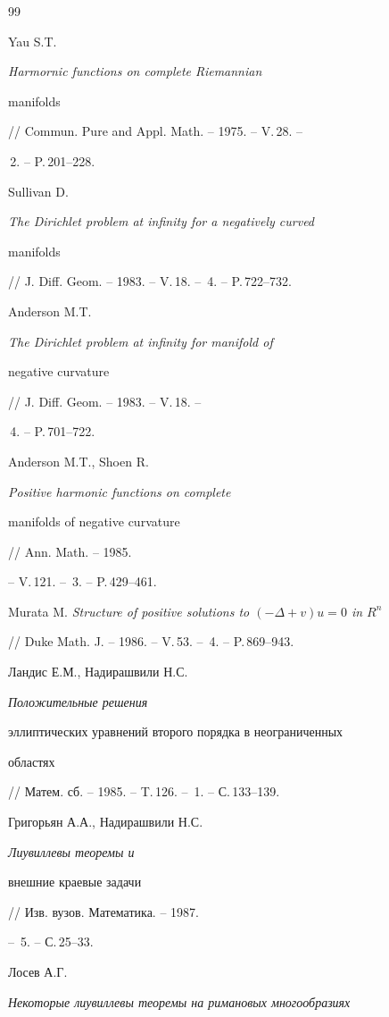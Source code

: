 \begin{thebibliography}{99} 


 




Yau S.T. {\em Harmornic functions on complete Riemannian


manifolds} // Commun. Pure and Appl. Math. -- 1975. -- V.\,28. --


\No\,2. -- P.\,201--228.




Sullivan D. {\em The Dirichlet problem at infinity for a negatively curved


manifolds} // J. Diff. Geom. -- 1983. -- V.\,18. -- \No\,4. -- P.\,722--732.




Anderson M.T. {\em The Dirichlet problem at infinity for manifold of


negative curvature} // J. Diff. Geom. -- 1983. -- V.\,18. --


\No\,4. -- P.\,701--722.




Anderson M.T., Shoen R. {\em Positive harmonic functions on complete


manifolds of negative curvature} // Ann. Math. -- 1985.


-- V.\,121. -- \No\,3. -- P.\,429--461.




Murata M. {\em Structure of positive solutions to $(-\Delta+v)u=0$ in $R^n$}


// Duke Math. J. -- 1986. -- V.\,53. -- \No\,4. -- P.\,869--943.




Ландис Е.М., Надирашвили Н.С. {\em Положительные решения


эллиптических уравнений второго порядка в неограниченных


областях} // Матем. сб. -- 1985. -- T.\,126. -- \No\,1. -- С.\,133--139.




Григорьян А.А., Надирашвили Н.С. {\em Лиувиллевы теоремы и


внешние краевые задачи} // Изв. вузов. Математика. -- 1987.


-- \No\,5. -- С.\,25--33.




Лосев А.Г. {\em Некоторые лиувиллевы теоремы на римановых многообразиях


}
\end{thebibliography}
